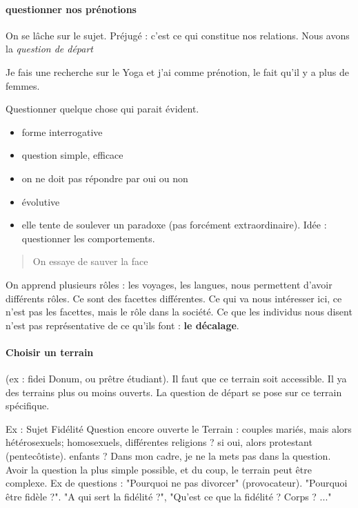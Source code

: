 \paragraph{questionner nos prénotions} On se lâche sur le sujet. Préjugé : c'est ce qui constitue nos relations. Nous avons la \textit{question de départ}


\begin{Ex}
Je fais une recherche sur le Yoga et j'ai comme prénotion, le fait qu'il y a plus de femmes.
\end{Ex}
\begin{Def}
Questionner quelque chose qui parait évident.
\begin{itemize}
\item forme interrogative
\item question simple, efficace
\item on ne doit pas répondre par oui ou non
\item évolutive
\item elle tente de soulever un paradoxe (pas forcément extraordinaire). Idée : questionner les comportements. 

\end{itemize}
\end{Def}


\begin{quote}
On essaye de sauver la face 
\end{quote}



On apprend plusieurs rôles : les voyages, les langues, nous permettent d'avoir différents rôles. Ce sont des facettes différentes. Ce qui va nous intéresser ici, ce n'est pas les facettes, mais le rôle dans la société. Ce que les individus nous disent n'est pas représentative de ce qu'ils font : \textbf{le décalage}.

\paragraph{Choisir un terrain}  (ex : fidei Donum, ou prêtre étudiant). Il faut que ce terrain soit accessible. Il ya des terrains plus ou moins ouverts. La question de départ se pose sur ce terrain spécifique. 

\begin{Ex}
Ex : Sujet Fidélité
Question encore ouverte
le Terrain : couples mariés, mais alors hétérosexuels; homosexuels, différentes religions ? si oui, alors protestant (pentecôtiste). enfants ? Dans mon cadre, je ne la mets pas dans la question. 
Avoir la question la plus simple possible, et du coup, le terrain peut être complexe. Ex de questions : "Pourquoi ne pas divorcer" (provocateur). "Pourquoi être fidèle ?". "A qui sert la fidélité ?", "Qu'est ce que la fidélité ? Corps ? ..."


\end{Ex}

